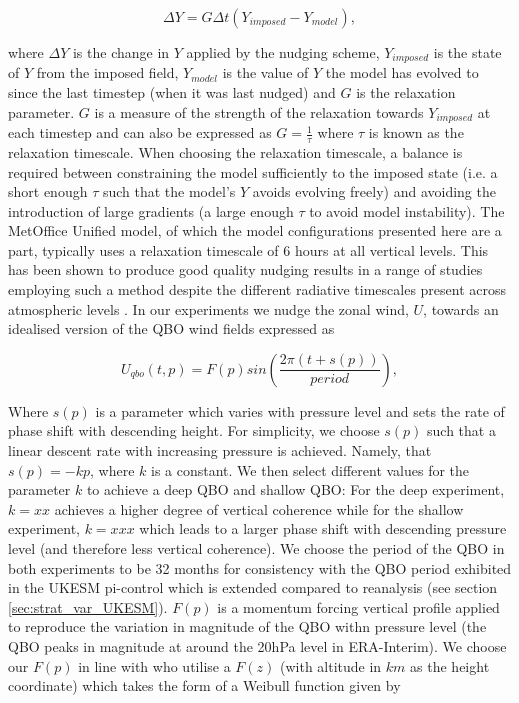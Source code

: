 \begin{equation} \label{eq:nudging}
\Delta Y = G \Delta t (Y_{imposed} - Y_{model}), 
\end{equation}

where $\Delta Y$ is the change in $Y$ applied by the nudging scheme, $Y_{imposed}$ is the state of $Y$ from the imposed field, $Y_{model}$ is the value of $Y$ the model has evolved to since the last timestep (when it was last nudged) and $G$ is the relaxation parameter. $G$ is a measure of the strength of the relaxation towards $Y_{imposed}$ at each timestep and can also be expressed as $G = \frac{1}{\tau}$ where $\tau$ is known as the relaxation timescale. When choosing the relaxation timescale, a balance is required between constraining the model sufficiently to the imposed state (i.e. a short enough $\tau$ such that the model's $Y$ avoids evolving freely) and avoiding the introduction of large gradients (a large enough $\tau$ to avoid model instability). The MetOffice Unified model, of which the model configurations presented here are a part, typically uses a relaxation timescale of 6 hours at all vertical levels. This has been shown to produce good quality nudging results in a range of studies employing such a method despite the different radiative timescales present across atmospheric levels \citep{grayForecasting2020}. In our experiments we nudge the zonal wind, $U$, towards an idealised version of the QBO wind fields expressed as 

\begin{equation} \label{eq:imposed_U}
U_{qbo}(t, p) = F(p) sin(\frac{2\pi (t + s(p))}{period}),
\end{equation}

Where $s(p)$ is a parameter which varies with pressure level and sets the rate of phase shift with descending height. For simplicity, we choose $s(p)$ such that a linear descent rate with increasing pressure is achieved. Namely, that $s(p) = -k p$, where $k$ is a constant. We then select different values for the parameter $k$ to achieve a deep QBO and shallow QBO: For the deep experiment, $k = xx$ achieves a higher degree of vertical coherence while for the shallow experiment, $k = xxx$ which leads to a larger phase shift with descending pressure level (and therefore less vertical coherence). We choose the period of the QBO in both experiments to be 32 months for consistency with the QBO period exhibited in the UKESM pi-control which is extended compared to reanalysis (see section \ref{sec:strat_var_UKESM}). $F(p)$ is a momentum forcing vertical profile applied to reproduce the variation in magnitude of the QBO withn pressure level (the QBO peaks in magnitude at around the 20hPa level in ERA-Interim). We choose our $F(p)$ in line with \cite{pascoeQuasibiennial2005b} who utilise a $F(z)$ (with altitude in $km$ as the height coordinate) which takes the form of a Weibull function given by

